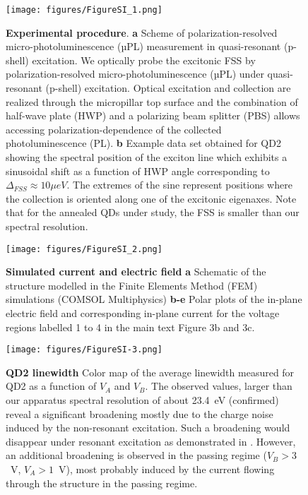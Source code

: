 \documentclass[article,twocolumn, superscriptaddress, 10pt, nofootinbib]{revtex4-1}%
\begin{document}
\vspace{1cm}

\setcounter{figure}{0}
\makeatletter
\renewcommand{\thefigure}{S\arabic{figure}}



\begin{figure}[ht!]
    \texttt{[image: figures/FigureSI\_1.png]}
    \caption{\textbf{Experimental procedure}. \textbf{a} Scheme of polarization-resolved micro-photoluminescence (µPL) measurement in quasi-resonant (p-shell) excitation. We optically probe the excitonic FSS  by polarization-resolved micro-photoluminescence (µPL) under quasi-resonant (p-shell) excitation.  Optical excitation and collection are realized through the micropillar top surface and the combination of  half-wave plate (HWP) and a polarizing beam splitter (PBS) allows accessing polarization-dependence of the collected photoluminescence (PL).  \textbf{b} Example data set obtained for QD2 showing the spectral position of the exciton line which exhibits a sinusoidal shift  as a function of HWP angle corresponding to  $\Delta_{FSS}\approx10\mu eV$. The extremes of the sine represent positions where the collection is oriented along one of the excitonic eigenaxes. Note that for the annealed QDs under study, the FSS is smaller than our spectral resolution.}
    \label{figSI_1}
\end{figure}


\begin{figure}
    \texttt{[image: figures/FigureSI\_2.png]}
    \caption{\textbf{Simulated current and electric field}  \textbf{a} Schematic of the structure modelled in the Finite Elements Method (FEM) simulations (COMSOL Multiphysics) \textbf{b-e} Polar plots of the in-plane electric field  and corresponding in-plane current for the voltage regions labelled  1 to 4 in the main text Figure 3b and 3c.}
    \label{figSI_2}
\end{figure}


\begin{figure}
    \texttt{[image: figures/FigureSI-3.png]}
    \caption{\textbf{QD2 linewidth} Color map of the average linewidth measured for QD2 as a function of $V_A$ and $V_B$. The observed values, larger than  our apparatus spectral resolution of about {23.4~\textmu eV  (confirmed)} reveal a significant broadening  mostly due to the charge noise induced by the non-resonant excitation. Such a broadening would disappear under resonant excitation as demonstrated in \cite{Somaschi2016,Ollivier2020}. However, an additional broadening is  observed in the passing regime ($V_B>3$~V, $V_A>1$~V), most probably induced by the current flowing through the structure in the passing regime.}
    \label{figSI_3}
\end{figure}
\end{document}
